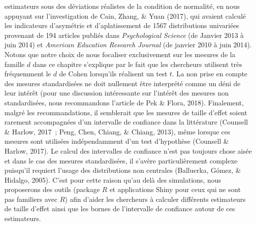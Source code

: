 \documentclass[
  12pt,
  french,
]{article}
\begin{document}
estimateurs sous des déviations réalistes de la condition de normalité,
en nous appuyant sur l'investigation de Cain, Zhang, \& Yuan (2017), qui
avaient calculé les indicateurs d'asymétrie et
d'aplatissement
de 1567 distributions univariées provenant de 194 articles publiés dans
\emph{Psychological Science} (de Janvier 2013 à juin 2014) et
\emph{American Education Research Journal} (de janvier 2010 à juin
2014). Notons que notre choix de nous focaliser exclusivement sur les
mesures de la famille \(d\) dans ce chapitre s'explique par le fait que
les chercheurs utilisent très fréquemment le \(d\) de Cohen lorsqu'ils
réalisent un test \(t\). La non prise en compte des mesures
standardisées ne doit nullement être interprété comme un déni de leur
intérêt
(pour une discussion intéressante sur l'intérêt des mesures non
standardisées, nous recommandons l'article de Pek \& Flora, 2018).
Finalement, malgré les recommandations, il semblerait que les mesures de
taille d'effet soient rarement accompagnées d'un intervalle de confiance
dans la littérature (Counsell \& Harlow, 2017~; Peng, Chen, Chiang, \&
Chiang, 2013), même lorsque ces mesures sont utilisées indépendamment
d'un test d'hypothèse (Counsell \& Harlow, 2017). Le calcul des
intervalles de confiance n'est pas toujours chose aisée et dans le cas
des mesures standardisées, il s'avère particulièrement complexe
puisqu'il requiert l'usage des distributions non centrales (Balluerka,
Gómez, \& Hidalgo, 2005). C'est pour cette raison qu'au delà des
simulations, nous proposerons des outils (package \(R\) et applications
Shiny pour ceux qui ne sont pas familiers avec \(R\)) afin d'aider les
chercheurs à calculer différents estimateurs de taille d'effet ainsi que
les bornes de l'intervalle de confiance autour de ces estimateurs.
\end{document}
